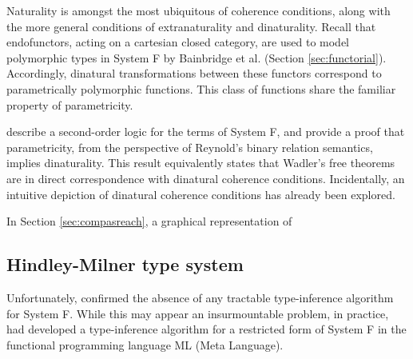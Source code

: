\documentclass[../Dissertation.tex]{subfiles}
\begin{document}
\par
Naturality is amongst the most ubiquitous of coherence conditions, along with the more general conditions of extranaturality and dinaturality. Recall that endofunctors, acting on a cartesian closed category, are used to model polymorphic types in System F by Bainbridge et al. (Section \ref{sec:functorial}). Accordingly, dinatural transformations between these functors correspond to parametrically polymorphic functions. This class of functions share the familiar property of parametricity.
\par
{} describe a second-order logic for the terms of System F, and provide a proof that parametricity, from the perspective of Reynold's binary relation semantics, implies dinaturality. This result equivalently states that Wadler's free theorems are in direct correspondence with dinatural coherence conditions. Incidentally, an intuitive depiction of dinatural coherence conditions has already been explored.
\par
In Section \ref{sec:compasreach}, a graphical representation of 

\subsection{Hindley-Milner type system}\label{sec:HMType}
Unfortunately,  confirmed the absence of any tractable type-inference algorithm for System F. While this may appear an insurmountable problem, in practice,  had developed a type-inference algorithm for a restricted form of System F in the functional programming language ML (Meta Language).
\end{document}
